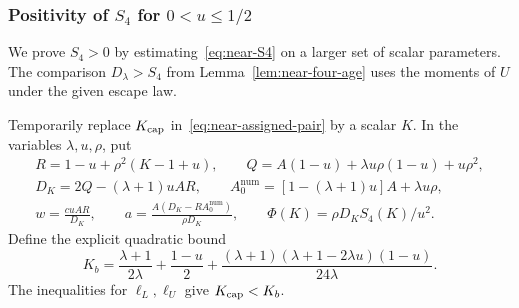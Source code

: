 \subsubsection{Positivity of \texorpdfstring{$S_4$ for $0<u\le1/2$}{S4 for 0 < u <= 1/2}}
We prove $S_4>0$ by estimating~\eqref{eq:near-S4} on a larger set of scalar parameters. The comparison $D_\lambda>S_4$ from Lemma~\ref{lem:near-four-age} uses the moments of $U$ under the given escape law.

Temporarily replace $K_{\rm cap}$ in~\eqref{eq:near-assigned-pair} by a scalar $K$. In the variables $\lambda,u,\rho$, put
\begin{equation}\label{eq:near-finite-calibration}
 \begin{gathered}
 R=1-u+\rho^2(K-1+u),\qquad
 Q=A(1-u)+\lambda u\rho(1-u)+u\rho^2,\\
 D_K=2Q-(\lambda+1)uAR,\qquad
 A_0^\mathrm{num}=[1-(\lambda+1)u]A+\lambda u\rho,\\
 w=\frac{cuAR}{D_K},\qquad
 a=\frac{A(D_K-RA_0^\mathrm{num})}{\rho D_K},\qquad
 \Phi(K)=\rho D_K S_4(K)/u^2.
 \end{gathered}
\end{equation}
Define the explicit quadratic bound
\begin{equation}\label{eq:near-Kb}
 K_b=\frac{\lambda+1}{2\lambda}+\frac{1-u}{2}
       +\frac{(\lambda+1)(\lambda+1-2\lambda u)(1-u)}{24\lambda}.
\end{equation}
The inequalities for $\ell_L,\ell_U$ give $K_{\rm cap}<K_b$.

